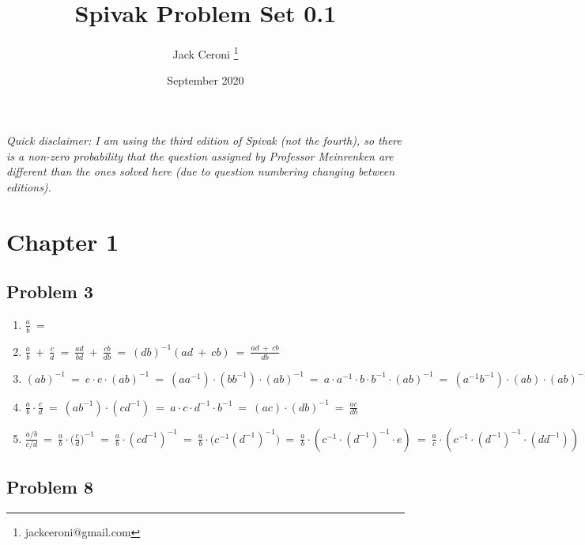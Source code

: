 \documentclass[10pt, oneside]{article}
\title{Spivak Problem Set 0.1}
\author{Jack Ceroni \thanks{jackceroni@gmail.com}}
\date{September 2020}
\begin{document}
\maketitle
\tableofcontents

\vspace{.25in}


\textit{Quick disclaimer: I am using the third edition of Spivak (not the fourth), so there is a non-zero probability that the
	question assigned by Professor Meinrenken are different than the ones solved here (due to question numbering changing
  between editions).}

\section{Chapter 1}

\subsection{Problem 3}

\begin{enumerate}

\item $\frac{a}{b} \ = \ $
  \item $\frac{a}{b} \ + \ \frac{c}{d} \ = \ \frac{ad}{bd} \ + \ \frac{cb}{db} \ = \ (db)^{-1} (ad \ + \ cb) \ = \ \frac{ad \ + \ cb}{db}$
	\item $(ab)^{-1} \ = \ e \cdot e \cdot (ab)^{-1} \ = \ (a a^{-1}) \cdot (b b^{-1}) \cdot (ab)^{-1} \ = \
		a \cdot a^{-1} \cdot b \cdot b^{-1} \cdot (ab)^{-1} \ = \ (a^{-1} b^{-1}) \cdot (ab) \cdot (ab)^{-1} \ = \
		a^{-1} b^{-1}$
	\item $\frac{a}{b} \cdot \frac{c}{d} \ = \ (a b^{-1}) \cdot (c d^{-1}) \ = \ a \cdot c \cdot d^{-1} \cdot b^{-1}
		\ = \ (ac) \cdot (db)^{-1} \ = \ \frac{ac}{db}$
	\item $\frac{a / b}{c / d} \ = \ \frac{a}{b} \cdot \Big( \frac{c}{d} \Big)^{-1} \ = \ \frac{a}{b} \cdot (c d^{-1})^{-1}
		\ = \ \frac{a}{b} \cdot \big( c^{-1} (d^{-1})^{-1} \big) \ = \ \frac{a}{b} \cdot
		(c^{-1} \cdot (d^{-1})^{-1} \cdot e) \ = \ \frac{a}{c} \cdot
		(c^{-1} \cdot (d^{-1})^{-1} \cdot (d d^{-1})) \ = \ \frac{a}{b} \cdot (c^{-1} d) \ = \
		\frac{a}{b} \cdot \frac{d}{c} \ = \
		\frac{ad}{bc}$

\end{enumerate}

\subsection{Problem 8}
\end{document}

